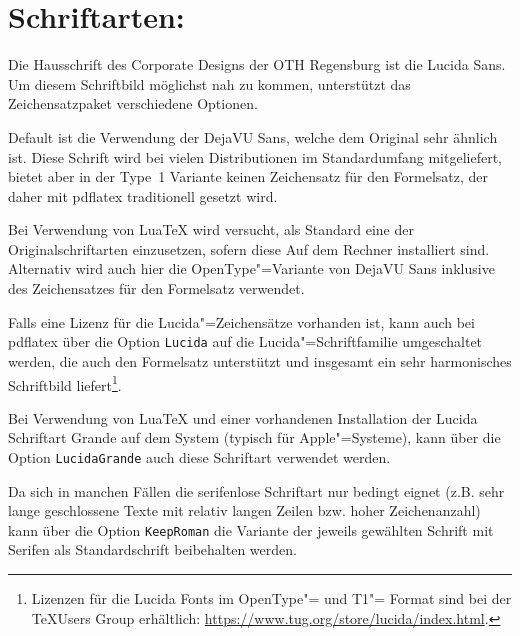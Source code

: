 \section{Schriftarten: }

Die Hausschrift des Corporate Designs der OTH Regensburg ist die Lucida Sans.
Um diesem Schriftbild möglichst nah zu kommen, unterstützt das Zeichensatzpaket verschiedene Optionen.

Default ist die Verwendung der DejaVU Sans, welche dem Original sehr ähnlich ist.
Diese Schrift wird bei vielen Distributionen im Standardumfang mitgeliefert, bietet aber in der Type~1 Variante keinen Zeichensatz für den Formelsatz, der daher mit pdflatex traditionell gesetzt wird.

Bei Verwendung von LuaTeX wird versucht, als Standard eine der Originalschriftarten einzusetzen, sofern diese Auf dem Rechner installiert sind.
Alternativ wird auch hier die OpenType"=Variante von DejaVU Sans inklusive des Zeichensatzes für den Formelsatz verwendet.

Falls eine Lizenz für die Lucida"=Zeichensätze vorhanden ist, kann auch bei pdflatex über die Option \texttt{Lucida} auf die Lucida"=Schriftfamilie umgeschaltet werden, die auch den Formelsatz unterstützt und insgesamt ein sehr harmonisches Schriftbild liefert\footnote{Lizenzen für die Lucida Fonts im OpenType"= und T1"= Format sind bei der \TeX Users Group erhältlich: \href{https://www.tug.org/store/lucida/index.html}{https://www.tug.org/store/lucida/index.html}.}.

Bei Verwendung von LuaTeX und einer vorhandenen Installation der Lucida Schriftart Grande auf dem System (typisch für Apple"=Systeme), kann über die Option \texttt{LucidaGrande} auch diese Schriftart verwendet werden.

Da sich in manchen Fällen die serifenlose Schriftart nur bedingt eignet (z.B. sehr lange geschlossene Texte mit relativ langen Zeilen bzw. hoher Zeichenanzahl) kann über die Option \texttt{KeepRoman} die Variante der jeweils gewählten Schrift mit Serifen als Standardschrift beibehalten werden.
